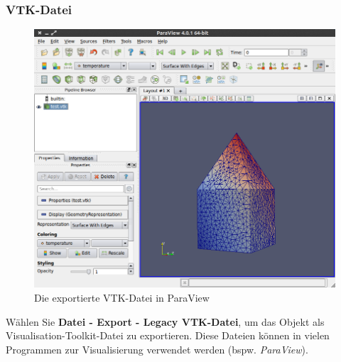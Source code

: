 \documentclass[10pt,a5paper,twoside,titlepage]{scrartcl}
\begin{document}
	\subsubsection{VTK-Datei}
	\begin{figure}
	\centering
	\includegraphics[trim=0cm 0cm 0cm 0cm,clip=true,scale=.3
	]{vtk_paraview.png}
	\caption{Die exportierte VTK-Datei in ParaView}
	\end{figure}	
	Wählen Sie \textbf{Datei - Export - Legacy VTK-Datei}, um das Objekt als Visualisation-Toolkit-Datei zu exportieren. Diese Dateien können in vielen Programmen zur Visualisierung verwendet werden (bspw. \emph{ParaView}).
	\newpage
\end{document}
